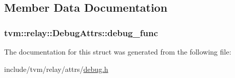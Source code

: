 \subsection{Member Data Documentation}
\subsubsection[{\texorpdfstring{debug\+\_\+func}{debug_func}}]{ tvm\+::relay\+::\+Debug\+Attrs\+::debug\+\_\+func}\hypertarget{structtvm_1_1relay_1_1DebugAttrs_aa57fc666a9674bdd94ad8e5ac4da18f7}{}\label{structtvm_1_1relay_1_1DebugAttrs_aa57fc666a9674bdd94ad8e5ac4da18f7}


The documentation for this struct was generated from the following file\+:\begin{DoxyCompactItemize}
\item 
include/tvm/relay/attrs/\hyperlink{debug_8h}{debug.\+h}\end{DoxyCompactItemize}
